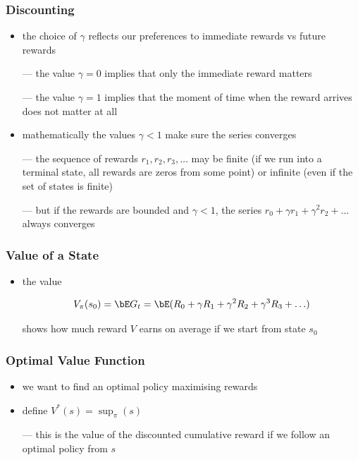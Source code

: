 \begin{frame}\frametitle{Discounting}
\begin{itemize}

\item the choice of $\gamma$ reflects our preferences to immediate
rewards vs future rewards

--- the value $\gamma = 0$ implies that only the immediate reward
    matters

--- the value $\gamma = 1$  implies that the moment of time when the
    reward arrives does not matter at all


\item mathematically the values $\gamma<1$ make sure the series
    converges

--- the sequence of rewards $r_1, r_2, r_3, \ldots$ may be finite (if
    we run into a terminal state, all rewards are zeros from some
    point) or infinite (even if the set of states is finite)

--- but if the rewards are bounded and $\gamma<1$, the series
    $r_0+\gamma r_1+\gamma^2r_2+\ldots$ always converges


\end{itemize}
\end{frame}


\begin{frame}\frametitle{Value of a State}
\begin{itemize}

\item the value

$$V_\pi(s_0) = \bE G_t = \bE ( R_0 + \gamma R_1 +\gamma^2 R_2
+ \gamma^3 R_3+\ldots)$$

shows how much reward $V$ earns on average if we start from state $s_0$

\end{itemize}
\end{frame}


\begin{frame}\frametitle{Optimal Value Function}
\begin{itemize}

\item we want to find an optimal policy maximising rewards

\item define $V^*(s) = \sup_\pi(s)$

--- this is the value of the discounted cumulative reward if we follow
    an optimal policy from $s$

\end{itemize}
\end{frame}


